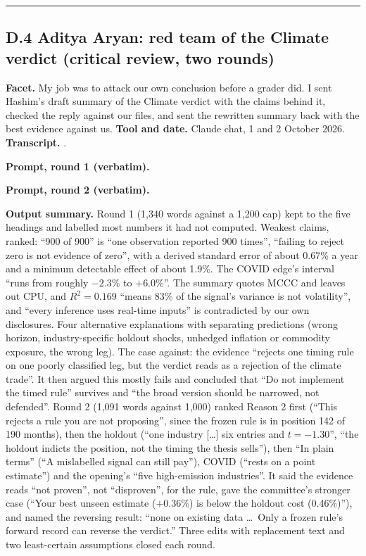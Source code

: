 \begin{center}\rule{0.5\linewidth}{0.5pt}\end{center}

\subsection*{D.4 Aditya Aryan: red team of the Climate verdict (critical review, two rounds)}

\textbf{Facet.} My job was to attack our own conclusion before a grader did. I sent Hashim's draft summary of the Climate verdict with the claims behind it, checked the reply against our files, and sent the rewritten summary back with the best evidence against us. \textbf{Tool and date.} Claude chat, 1 and 2 October 2026. \textbf{Transcript.} .

\textbf{Prompt, round 1 (verbatim).}
\begin{promptbox}

\end{promptbox}

\textbf{Prompt, round 2 (verbatim).}
\begin{promptbox}

\end{promptbox}

\textbf{Output summary.} Round 1 (1,340 words against a 1,200 cap) kept to the five headings and labelled most numbers it had not computed. Weakest claims, ranked: ``900 of 900'' is ``one observation reported 900 times'', ``failing to reject zero is not evidence of zero'', with a derived standard error of about 0.67\% a year and a minimum detectable effect of about 1.9\%. The COVID edge's interval ``runs from roughly $-2.3\%$ to $+6.0\%$''. The summary quotes MCCC and leaves out CPU, and $R^2=0.169$ ``means 83\% of the signal's variance is not volatility'', and ``every inference uses real-time inputs'' is contradicted by our own disclosures. Four alternative explanations with separating predictions (wrong horizon, industry-specific holdout shocks, unhedged inflation or commodity exposure, the wrong leg). The case against: the evidence ``rejects one timing rule on one poorly classified leg, but the verdict reads as a rejection of the climate trade''. It then argued this mostly fails and concluded that ``Do not implement the timed rule'' survives and ``the broad version should be narrowed, not defended''. Round 2 (1,091 words against 1,000) ranked Reason 2 first (``This rejects a rule you are not proposing'', since the frozen rule is in position 142 of 190 months), then the holdout (``one industry [\ldots] six entries and $t=-1.30$'', ``the holdout indicts the position, not the timing the thesis sells''), then ``In plain terms'' (``A mislabelled signal can still pay''), COVID (``rests on a point estimate'') and the opening's ``five high-emission industries''. It said the evidence reads ``not proven'', not ``disproven'', for the rule, gave the committee's stronger case (``Your best unseen estimate ($+0.36\%$) is below the holdout cost (0.46\%)''), and named the reversing result: ``none on existing data \ldots\ Only a frozen rule's forward record can reverse the verdict.'' Three edits with replacement text and two least-certain assumptions closed each round.

